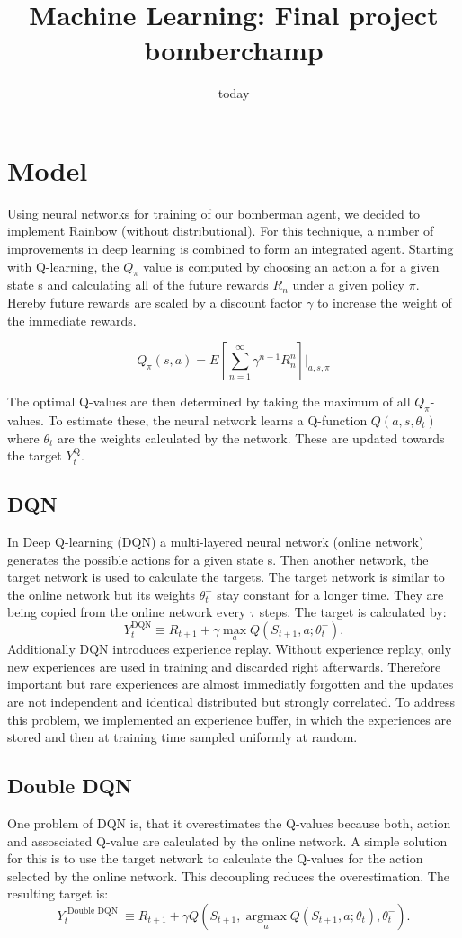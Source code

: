 \documentclass[12pt]{article}
\title{Machine Learning: Final project bomberchamp}
\date{today}
\begin{document}
\section{Model}
Using neural networks for training of our bomberman agent, we decided to implement Rainbow (without distributional). For this technique, a number of improvements in deep learning is combined to form an integrated agent. Starting with Q-learning, the $Q_\pi$ value is computed by choosing an action a for a given state s and calculating all of the future rewards $R_n$ under a given policy $\pi$.
Hereby future rewards are scaled by a discount factor $\gamma$ to increase the weight of the immediate rewards.

\begin{equation}
Q_\pi(s,a)= E\left[\sum_{n=1}^{\infty} \gamma^{n-1}R_n^n\right] \Bigg|_{a,s,\pi}
\end{equation}

The optimal Q-values are then determined by taking the maximum of all $Q_\pi$-values.
To estimate these, the neural network learns a Q-function $Q(a, s, \theta_t)$ where $\theta_t$ are the weights calculated by the network.
These are updated towards the target $Y_{t}^{\mathrm{Q}}$.
\subsection{DQN}
In Deep Q-learning (DQN) a multi-layered neural network (online network) generates the possible actions for a given state s. Then another network, the target network is used to calculate the targets.
The target network is similar to the online network but its weights $\theta_t^-$ stay constant for a longer time. They are being copied from the online network every $\tau$ steps.
The target is calculated by:
\begin{equation}
Y_{t}^{\mathrm{DQN}} \equiv R_{t+1}+\gamma \max _{a} Q\left(S_{t+1}, a ; \theta_{t}^{-}\right).
\end{equation}
Additionally DQN introduces experience replay. Without experience replay, only new experiences are used in training and discarded right afterwards.
Therefore important but rare experiences are almost immediatly forgotten and the updates are not independent and identical distributed but strongly correlated.
To address this problem, we implemented an experience buffer, in which the experiences are stored and then at training time sampled uniformly at random.
\subsection{Double DQN}
One problem of DQN is, that it overestimates the Q-values because both, action and assosciated Q-value are calculated by the online network.
A simple solution for this is to use the target network to calculate the Q-values for the action selected by the online network. This decoupling reduces the overestimation.
The resulting target is:
\begin{equation}
Y_{t}^{\text { Double DQN }} \equiv R_{t+1}+\gamma Q\left(S_{t+1}, \underset{a}{\operatorname{argmax}} Q\left(S_{t+1}, a ; \theta_{t}\right), \theta_{t}^{-}\right).
\end{equation}
\end{document}
